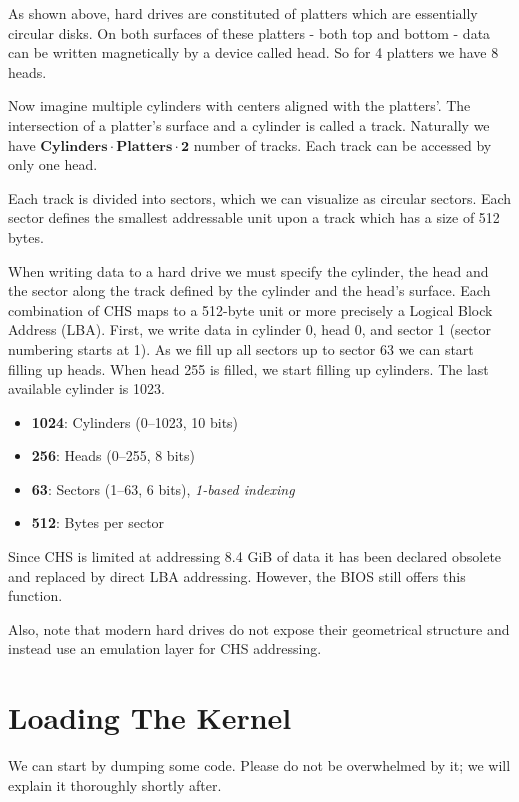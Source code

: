 As shown above, hard drives are constituted of platters which are essentially circular disks. On both surfaces
of these platters - both top and bottom - data can be written magnetically by a device called head. So for 
4 platters we have 8 heads. 

Now imagine multiple cylinders with centers aligned with the platters'. The intersection of a platter's surface 
and a cylinder is called a track. Naturally we have \(\textbf{Cylinders} \cdot \textbf{Platters} \cdot \textbf{2}\)
number of tracks. Each track can be accessed by only one head.

Each track is divided into sectors, which we can visualize as circular sectors. Each sector defines the smallest addressable
unit upon a track which has a size of 512 bytes.

When writing data to a hard drive we must specify the cylinder, the head and the sector along the track defined by the
cylinder and the head's surface. Each combination of CHS maps to a 512-byte unit or more precisely a Logical Block 
Address (LBA). First, we write data in cylinder 0, head 0, and sector 1 (sector numbering starts at 1). As we 
fill up all sectors up to sector 63 we can start filling up heads. When head 255 is filled, we start filling up cylinders. The 
last available cylinder is 1023. 

\begin{itemize}
    \item \textbf{1024}: Cylinders (0–1023, 10 bits)
    \item \textbf{256}: Heads (0–255, 8 bits)
    \item \textbf{63}: Sectors (1–63, 6 bits), \textit{1-based indexing}
    \item \textbf{512}: Bytes per sector
\end{itemize}

Since CHS is limited at addressing 8.4 GiB of data it has been declared obsolete and replaced by direct LBA addressing.
However, the BIOS still offers this function.

Also, note that modern hard drives do not expose their geometrical structure and instead use an emulation layer for
CHS addressing.

\section{Loading The Kernel}

We can start by dumping some code. Please do not be overwhelmed by it; we will explain it thoroughly shortly after.


